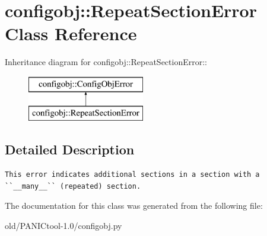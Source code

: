 \section{configobj::Repeat\-Section\-Error Class Reference}
\label{classconfigobj_1_1RepeatSectionError}
Inheritance diagram for configobj::Repeat\-Section\-Error::\begin{figure}[H]
\begin{center}
\leavevmode
\includegraphics[height=2cm]{classconfigobj_1_1RepeatSectionError}
\end{center}
\end{figure}


\subsection{Detailed Description}


\footnotesize\begin{verbatim}
This error indicates additional sections in a section with a
``__many__`` (repeated) section.
\end{verbatim}
\normalsize
 



The documentation for this class was generated from the following file:\begin{CompactItemize}
\item 
old/PANICtool-1.0/configobj.py\end{CompactItemize}
